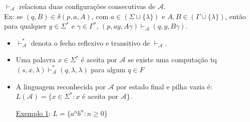 \documentclass{article}
\begin{document}
    $\vdash_\mathcal{A}$ relaciona duas configurações consecutivas de $\mathcal{A}$.\\
    Ex: se $ (q,B) \in \delta(p,a,A)$, com $ a \in (\Sigma \cup \{\lambda\} ) $ e $ A, B \in (\Gamma \cup \{\lambda\} ) $,
        então para qualquer $y \in \Sigma^* $ e $ \gamma \in \Gamma^* $, $ ( p, ay, A\gamma ) \vdash_\mathcal{A} (q, y, B
        \gamma )$.
    
    \begin{itemize}
        \item $\vdash_\mathcal{A}^*$ denota o fecho reflexivo e transitivo de $\vdash_\mathcal{A}$.
        \item Uma palavra $x \in \Sigma^*$ é aceita por $\mathcal{A}$ se existe uma computação tq\\
            $ ( s, x, \lambda ) \vdash_\mathcal{A}^* ( q, \lambda, \lambda ) $ para algum $ q \in F$
        \item A linguagem reconhecida por $\mathcal{A}$ por estado final e pilha vazia é:\\
            $ L(\mathcal{A}) = \{ x \in \Sigma^* : x $ é aceita por $ \mathcal{A} \} $.
    \end{itemize}
    
    \begin{itemize}
        \item [\underline{Exemplo 1}:] $ L = \{ a^nb^n: n \geq 0 \} $
    \end{itemize}
\end{document}
